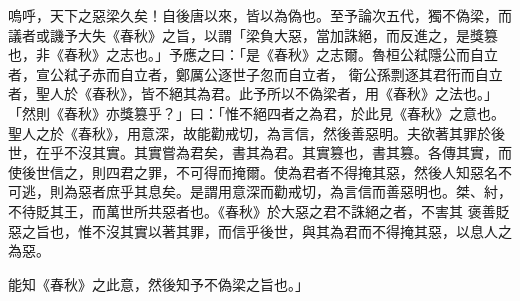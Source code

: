 \begin{pinyinscope}
 嗚呼，天下之惡梁久矣！自後唐以來，皆以為偽也。至予論次五代，獨不偽梁，而議者或譏予大失《春秋》之旨，以謂「梁負大惡，當加誅絕，而反進之，是獎篡也，非《春秋》之志也。」予應之曰：「是《春秋》之志爾。魯桓公弒隱公而自立者，宣公弒子赤而自立者，鄭厲公逐世子忽而自立者，
 衛公孫剽逐其君衎而自立者，聖人於《春秋》，皆不絕其為君。此予所以不偽梁者，用《春秋》之法也。」「然則《春秋》亦獎篡乎？」曰：「惟不絕四者之為君，於此見《春秋》之意也。聖人之於《春秋》，用意深，故能勸戒切，為言信，然後善惡明。夫欲著其罪於後世，在乎不沒其實。其實嘗為君矣，書其為君。其實篡也，書其篡。各傳其實，而使後世信之，則四君之罪，不可得而掩爾。使為君者不得掩其惡，然後人知惡名不可逃，則為惡者庶乎其息矣。是謂用意深而勸戒切，為言信而善惡明也。桀、紂，不待貶其王，而萬世所共惡者也。《春秋》於大惡之君不誅絕之者，不害其
 褒善貶惡之旨也，惟不沒其實以著其罪，而信乎後世，與其為君而不得掩其惡，以息人之為惡。



 能知《春秋》之此意，然後知予不偽梁之旨也。」



\end{pinyinscope}